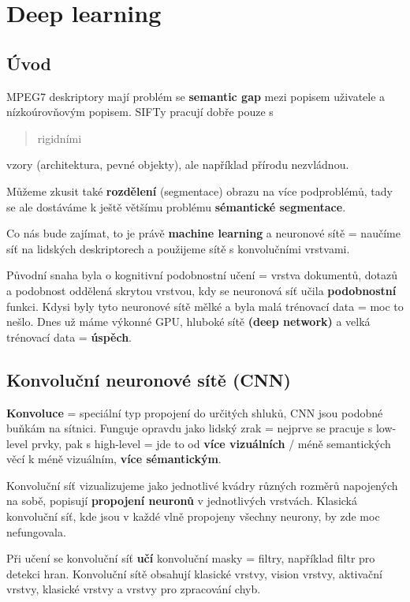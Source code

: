 \section{Deep learning}

\subsection*{Úvod}

MPEG7 deskriptory mají problém se \textbf{semantic gap} mezi popisem uživatele a nízkoúrovňovým popisem. SIFTy pracují dobře pouze s \blockquote{rigidními} vzory (architektura, pevné objekty), ale například přírodu nezvládnou.

Můžeme zkusit také \textbf{rozdělení} (segmentace) obrazu na více podproblémů, tady se ale dostáváme k ještě většímu problému \textbf{sémantické segmentace}.

Co nás bude zajímat, to je právě \textbf{machine learning} a neuronové sítě = naučíme síť na lidských deskriptorech a použijeme sítě s konvolučními vrstvami.

Původní snaha byla o kognitivní podobnostní učení = vrstva dokumentů, dotazů a podobnost oddělená skrytou vrstvou, kdy se neuronová síť učila \textbf{podobnostní} funkci. Kdysi byly tyto neuronové sítě mělké a byla malá trénovací data = moc to nešlo. Dnes už máme výkonné GPU, hluboké sítě \textbf{(deep network)} a velká trénovací data = \textbf{úspěch}.

\subsection{Konvoluční neuronové sítě (CNN)}

\textbf{Konvoluce} = speciální typ propojení do určitých shluků, CNN jsou podobné buňkám na sítnici. Funguje opravdu jako lidský zrak = nejprve se pracuje s low-level prvky, pak s high-level = jde to od \textbf{více vizuálních} / méně semantických věcí k méně vizuálním, \textbf{více sémantickým}.

Konvoluční síť vizualizujeme jako jednotlivé kvádry různých rozměrů napojených na sobě, popisují \textbf{propojení neuronů} v jednotlivých vrstvách. Klasická konvoluční síť, kde jsou v každé vlně propojeny všechny neurony, by zde moc nefungovala.

Při učení se konvoluční síť \textbf{učí} konvoluční masky = filtry, například filtr pro detekci hran. Konvoluční sítě obsahují klasické vrstvy, vision vrstvy, aktivační vrstvy, klasické vrstvy a vrstvy pro zpracování chyb.

